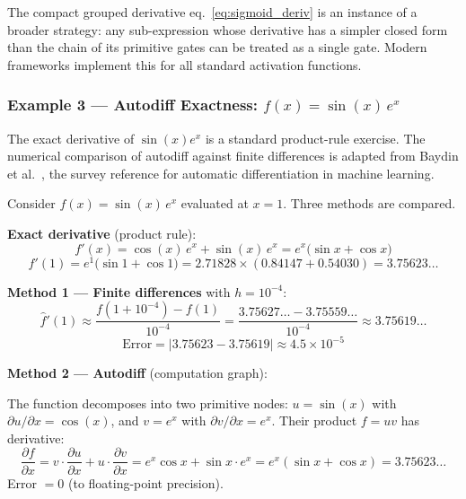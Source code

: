 \documentclass[12pt, a4paper]{article}
\begin{document}
The compact grouped derivative eq.~\eqref{eq:sigmoid_deriv} is an instance of a
broader strategy: any sub-expression whose derivative has a simpler closed form
than the chain of its primitive gates can be treated as a single gate. Modern
frameworks implement this for all standard activation functions.

\subsubsection{Example 3 — Autodiff Exactness:
               \texorpdfstring{$f(x) = \sin(x)\,e^x$}{f(x)=sin(x)*exp(x)}}
\label{ex:autodiff_exact}

\text The exact derivative of $\sin(x)e^x$ is a standard product-rule exercise.
The numerical comparison of autodiff against finite differences is adapted from
Baydin et al.\ \cite{baydin2018autodiff}, the survey reference for automatic
differentiation in machine learning.

\medskip
Consider $f(x) = \sin(x)\,e^x$ evaluated at $x = 1$. Three methods are compared.

\textbf{Exact derivative} (product rule):
\begin{equation}
    f'(x) = \cos(x)\,e^x + \sin(x)\,e^x = e^x\bigl(\sin x + \cos x\bigr)
    \label{eq:sinexp_exact}
\end{equation}
\begin{equation}
    f'(1) = e^1\bigl(\sin 1 + \cos 1\bigr)
           = 2.71828\times(0.84147 + 0.54030)
           = \mathbf{3.75623\ldots}
    \label{eq:sinexp_exact_val}
\end{equation}

\textbf{Method 1 — Finite differences} with $h = 10^{-4}$:
\begin{equation}
    \hat{f}'(1) \approx
    \frac{f(1 + 10^{-4}) - f(1)}{10^{-4}}
    = \frac{3.75627\ldots - 3.75559\ldots}{10^{-4}}
    \approx \mathbf{3.75619\ldots}
    \label{eq:sinexp_fd}
\end{equation}
\begin{equation}
    \text{Error} = |3.75623 - 3.75619| \approx 4.5 \times 10^{-5}
    \label{eq:sinexp_fd_err}
\end{equation}

\textbf{Method 2 — Autodiff} (computation graph):

The function decomposes into two primitive nodes:
$u = \sin(x)$ with $\partial u/\partial x = \cos(x)$, and
$v = e^x$ with $\partial v/\partial x = e^x$.
Their product $f = uv$ has derivative:
\begin{equation}
    \frac{\partial f}{\partial x}
    = v \cdot \frac{\partial u}{\partial x} + u \cdot \frac{\partial v}{\partial x}
    = e^x \cos x + \sin x \cdot e^x
    = e^x(\sin x + \cos x)
    = \mathbf{3.75623\ldots}
    \label{eq:sinexp_ad}
\end{equation}
Error $= 0$ (to floating-point precision).
\end{document}
